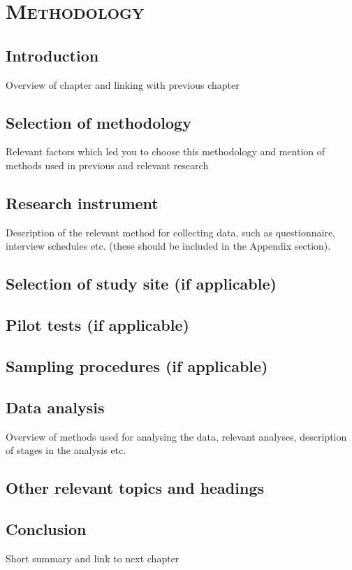 %
%
% 
% 
% 

\chapter{\textsc{Methodology}}
\label{chap:method}

\section{Introduction}
\label{sec:introchapter3}
Overview of chapter and linking with previous chapter

\section{Selection of methodology}
\label{sec:selectionmethod}

Relevant factors which led you to choose this methodology and mention of methods used in previous and relevant research

\section{Research instrument}
\label{sec:researchinstrument}

Description of the relevant method for collecting data, such as questionnaire, interview schedules etc. (these should be included in the Appendix section). 

\section{Selection of study site (if applicable)}

\section{Pilot tests (if applicable)}

\section{Sampling procedures (if applicable) }

\section{Data analysis}
\label{sec:dataanalysis}

Overview of methods used for analysing the data, relevant analyses, description of stages in the analysis etc. 

\section{Other relevant topics and headings}
\label{sec:othertopics}

\section{Conclusion}
\label{sec:conclucionchapter3}
Short summary and link to next chapter
